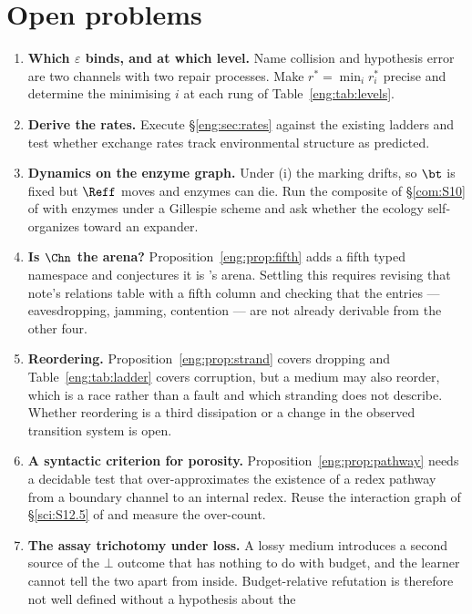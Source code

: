 \section{Open problems}\label{eng:S14}
\label{eng:sec:open}

\begin{enumerate}[itemsep=4pt]
\item \textbf{Which $\varepsilon$ binds, and at which level.} Name
collision and hypothesis error are two channels with two repair processes.
Make $r^\ast = \min_i r^\ast_i$ precise and determine the minimising $i$ at
each rung of Table~\ref{eng:tab:levels}.
\item \textbf{Derive the rates.} Execute \S\ref{eng:sec:rates} against the
existing ladders and test whether exchange rates track environmental
structure as predicted.
\item \textbf{Dynamics on the enzyme graph.} Under (i) the marking drifts,
so $\bt$ is fixed but $\Reff$ moves and enzymes can die. Run the composite
of \S\ref{com:S10} of \chComp with enzymes under a Gillespie scheme and ask
whether the ecology self-organizes toward an expander.
\item \textbf{Is $\Chn$ the arena?} Proposition~\ref{eng:prop:fifth} adds a
fifth typed namespace and conjectures it is \chComp's arena.
Settling this requires revising that note's relations table with a fifth
column and checking that the entries --- eavesdropping, jamming,
contention --- are not already derivable from the other four.
\item \textbf{Reordering.} Proposition~\ref{eng:prop:strand} covers dropping
and Table~\ref{eng:tab:ladder} covers corruption, but a medium may also
reorder, which is a race rather than a fault and which stranding does not
describe. Whether reordering is a third dissipation or a change in the
observed transition system is open.
\item \textbf{A syntactic criterion for porosity.}
Proposition~\ref{eng:prop:pathway} needs a decidable test that
over-approximates the existence of a redex pathway from a boundary
channel to an internal redex. Reuse the interaction graph of
\S\ref{sci:S12.5} of \chSci and measure the over-count.
\item \textbf{The assay trichotomy under loss.} A lossy medium introduces
a second source of the $\bot$ outcome that has nothing to do with budget,
and the learner cannot tell the two apart from inside. Budget-relative
refutation is therefore not well defined without a hypothesis about the

\end{enumerate}
